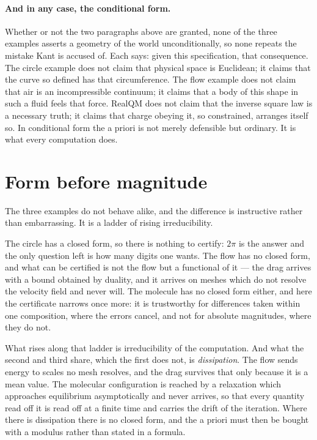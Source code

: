 \documentclass[11pt]{article}
\begin{document}
\paragraph{And in any case, the conditional form.} Whether or not the two paragraphs above are
granted, none of the three examples asserts a geometry of the world unconditionally, so none repeats
the mistake Kant is accused of. Each says: given this specification, that consequence. The circle
example does not claim that physical space is Euclidean; it claims that the curve so defined has
that circumference. The flow example does not claim that air is an incompressible continuum; it
claims that a body of this shape in such a fluid feels that force. RealQM does not claim that the
inverse square law is a necessary truth; it claims that charge obeying it, so constrained, arranges
itself so. In conditional form the a priori is not merely defensible but ordinary. It is what every
computation does.

\section{Form before magnitude}\label{sec:form}

The three examples do not behave alike, and the difference is instructive rather than embarrassing.
It is a ladder of rising irreducibility.

The circle has a closed form, so there is nothing to certify: $2\pi$ is the answer and the only
question left is how many digits one wants. The flow has no closed form, and what can be certified
is not the flow but a functional of it --- the drag arrives with a bound obtained by duality, and it
arrives on meshes which do not resolve the velocity field and never will. The molecule has no closed
form either, and here the certificate narrows once more: it is trustworthy for differences taken
within one composition, where the errors cancel, and not for absolute magnitudes, where they do not.

What rises along that ladder is irreducibility of the computation. And what the second and third share,
which the first does not, is \emph{dissipation}. The flow sends energy to scales no mesh resolves,
and the drag survives that only because it is a mean value. The molecular configuration is reached
by a relaxation which approaches equilibrium asymptotically and never arrives, so that every
quantity read off it is read off at a finite time and carries the drift of the iteration. Where
there is dissipation there is no closed form, and the a priori must then be bought with a modulus
rather than stated in a formula.
\end{document}
